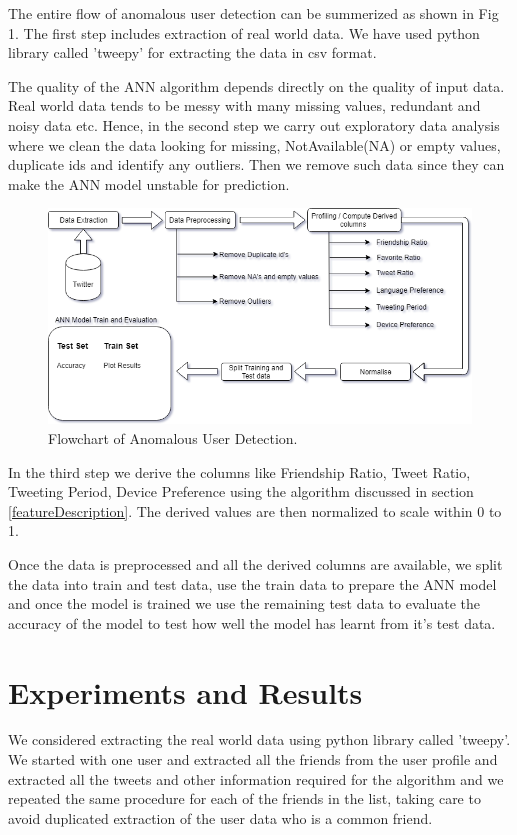 \documentclass[conference]{IEEEtran}
\begin{document}
The entire flow of anomalous user detection can be summerized as shown in Fig 1. The first step includes extraction of real world data. 
We have used python library called 'tweepy' for extracting the data in csv format.

The quality of the ANN algorithm depends directly on the quality of input data. Real world data tends to be messy with many missing values, 
redundant and noisy data etc. Hence, in the second step we carry out exploratory data analysis where we clean the data looking for missing, 
NotAvailable(NA) or empty values, duplicate ids and identify any outliers. Then we remove such data since they can make the ANN model unstable for prediction.

\begin{figure}[h!]
	\includegraphics[scale=0.7]{Methodology}
	\caption{Flowchart of Anomalous User Detection.}
\end{figure}

In the third step we derive the columns like Friendship Ratio, Tweet Ratio, Tweeting Period, Device Preference using the algorithm discussed in section 
\ref{featureDescription}. The derived values are then normalized to scale within 0 to 1.

Once the data is preprocessed and all the derived columns are available, we split the data into train and test data, use the train data to prepare the ANN model and once the model is trained we use the remaining test data to evaluate the 
accuracy of the model to test how well the model has learnt from it's test data.

\section{Experiments and Results}
	  We considered extracting the real world data using python library called 'tweepy'. We started with one user and extracted all the friends 
	  from the user profile and extracted all the tweets and other information required for the algorithm and we repeated the same procedure for each 
	  of the friends in the list, taking care to avoid duplicated extraction of the user data who is a common friend. 
	   
\end{document}
